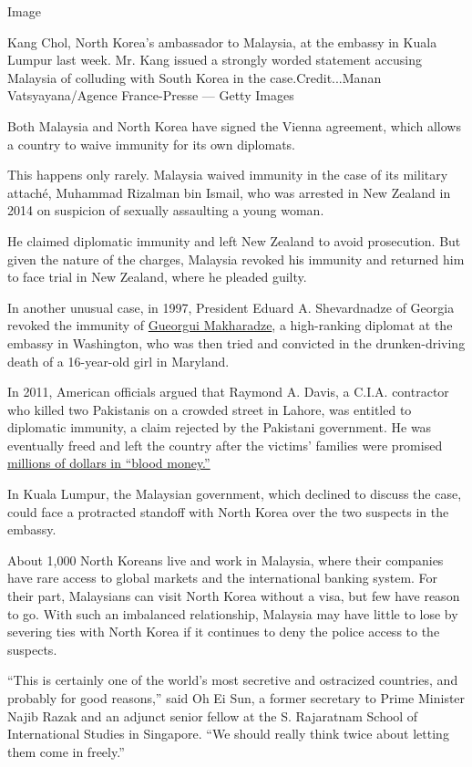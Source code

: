 Image

Kang Chol, North Korea's ambassador to Malaysia, at the embassy in Kuala
Lumpur last week. Mr. Kang issued a strongly worded statement accusing
Malaysia of colluding with South Korea in the case.Credit...Manan
Vatsyayana/Agence France-Presse --- Getty Images

Both Malaysia and North Korea have signed the Vienna agreement, which
allows a country to waive immunity for its own diplomats.

This happens only rarely. Malaysia waived immunity in the case of its
military attaché, Muhammad Rizalman bin Ismail, who was arrested in New
Zealand in 2014 on suspicion of sexually assaulting a young woman.

He claimed diplomatic immunity and left New Zealand to avoid
prosecution. But given the nature of the charges, Malaysia revoked his
immunity and returned him to face trial in New Zealand, where he pleaded
guilty.

In another unusual case, in 1997, President Eduard A. Shevardnadze of
Georgia revoked the immunity of
\href{http://www.nytimes3xbfgragh.onion/1997/10/09/us/georgian-diplomat-pleads-guilty-in-death-of-teen-age-girl.html}{Gueorgui
Makharadze}, a high-ranking diplomat at the embassy in Washington, who
was then tried and convicted in the drunken-driving death of a
16-year-old girl in Maryland.

In 2011, American officials argued that Raymond A. Davis, a C.I.A.
contractor who killed two Pakistanis on a crowded street in Lahore, was
entitled to diplomatic immunity, a claim rejected by the Pakistani
government. He was eventually freed and left the country after the
victims' families were promised
\href{http://www.nytimes3xbfgragh.onion/2011/03/17/world/asia/17pakistan.html}{millions
of dollars in ``blood money.''}

In Kuala Lumpur, the Malaysian government, which declined to discuss the
case, could face a protracted standoff with North Korea over the two
suspects in the embassy.

About 1,000 North Koreans live and work in Malaysia, where their
companies have rare access to global markets and the international
banking system. For their part, Malaysians can visit North Korea without
a visa, but few have reason to go. With such an imbalanced relationship,
Malaysia may have little to lose by severing ties with North Korea if it
continues to deny the police access to the suspects.

``This is certainly one of the world's most secretive and ostracized
countries, and probably for good reasons,'' said Oh Ei Sun, a former
secretary to Prime Minister Najib Razak and an adjunct senior fellow at
the S. Rajaratnam School of International Studies in Singapore. ``We
should really think twice about letting them come in freely.''

